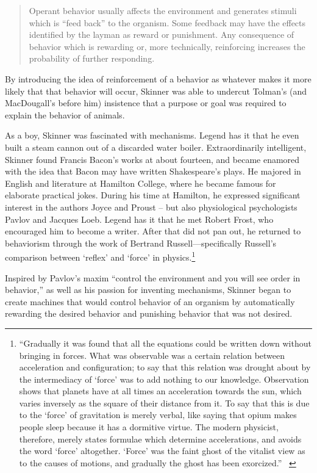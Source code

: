 \begin{refsection}
\begin{quote}

Operant behavior usually affects the environment and generates stimuli which is ``feed back'' to the organism. Some feedback may have the effects identified by the layman as reward or punishment. Any consequence of behavior which is rewarding or, more technically, reinforcing increases the probability of further responding. ~\citep[p. 129]{Skinner:1972wq}
\end{quote}

By introducing the idea of reinforcement of a behavior as whatever makes it more likely that that behavior will occur, Skinner was able to undercut Tolman's (and MacDougall's before him) insistence that a purpose or goal was required to explain the behavior of animals.

As a boy, Skinner was fascinated with mechanisms. Legend has it that he even built a steam cannon out of a discarded water boiler. Extraordinarily intelligent, Skinner found Francis Bacon's works at about fourteen, and became enamored with the idea that Bacon may have written Shakespeare's plays. He majored in English and literature at Hamilton College, where he became famous for elaborate practical jokes. During his time at Hamilton, he expressed significant interest in the authors Joyce and Proust – but also physiological psychologists Pavlov and Jacques Loeb. Legend has it that he met Robert Frost, who encouraged him to become a writer. After that did not pan out, he returned to behaviorism through the work of Bertrand Russell---specifically Russell's comparison between `reflex' and `force' in physics.\footnote{``Gradually it was found that all the equations could be written down without bringing in forces. What was observable was a certain relation between acceleration and configuration; to say that this relation was drought about by the intermediacy of `force' was to add nothing to our knowledge. Observation shows that planets have at all times an acceleration towards the sun, which varies inversely as the square of their distance from it. To say that this is due to the `force' of gravitation is merely verbal, like saying that opium makes people sleep because it has a dormitive virtue. The modern physicist, therefore, merely states formulae which determine accelerations, and avoids the word `force' altogether. `Force' was the faint ghost of the vitalist view as to the causes of motions, and gradually the ghost has been exorcized.'' ~\citep[p 495]{Russell:2013wy}}

Inspired by Pavlov's maxim ``control the environment and you will see order in behavior,'' as well as his passion for inventing mechanisms, Skinner began to create machines that would control behavior of an organism by automatically rewarding the desired behavior and punishing behavior that was not desired.


\end{refsection}
